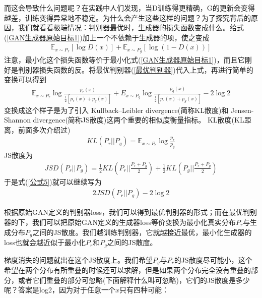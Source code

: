             而这会导致什么问题呢？在实践中人们发现，当D训练得更精确，G的更新会变得越差，训练变得异常地不稳定。为什么会产生这些这样的问题？为了探究背后的原因，我们就看看极端情况：判别器最优时，生成器的损失函数变成什么。给式(\ref{GAN生成器原始目标1})加上一个不依赖于生成器的项，使之变成
            \begin{align*}
            \mathbb{E}_{x\sim P_r}[\log D(x)] + \mathbb{E}_{x\sim P_g}[\log (1-D(x))]
            \end{align*}
            注意，最小化这个损失函数等价于最小化式(\ref{GAN生成器原始目标1})，而且它刚好是判别器损失函数的反。将最优判别器(\ref{最优判别器})代入上式，再进行简单的变换可以得到
            \begin{align}
            \label{公式5}
            \mathbb{E}_{x\sim P_r}\log \frac{p_r(x)}{\frac{1}{2}[p_r(x) + p_g(x)]} + E_{x\sim P_g}\log \frac{p_g(x)}{\frac{1}{2}[p_r(x)+p_g(x)]} - 2\log 2
            \end{align}
            变换成这个样子是为了引入 Kullback–Leibler divergence(简称KL散度)和 Jensen-Shannon divergence(简称JS散度)这两个重要的相似度衡量指标。
            KL散度(KL距离，前面多次介绍过)
            \begin{align*}
            KL(P_r||P_g) = \mathbb{E}_{x\sim P_r}\log \frac{p_r}{p_g}
            \end{align*}
            JS散度为
            \begin{align}
            \label{JS散度}
            JSD(P_r||P_g) = \frac{1}{2}KL \left( P_r \Big|\Big| \frac{P_r+P_g}{2} \right) + \frac{1}{2} KL\left( P_g \Big|\Big| \frac{P_r+P_g}{2} \right)
            \end{align}
            于是式(\ref{公式5})就可以继续写为
            \begin{align*}
            2JSD(P_r||P_g) - 2\log 2
            \end{align*}
            \par
            根据原始GAN定义的判别器loss，我们可以得到最优判别器的形式；而在最优判别器的下，我们可以把原始GAN定义的生成器loss等价变换为最小化真实分布$P_r$与生成分布$P_g$之间的JS散度。我们越训练判别器，它就越接近最优，最小化生成器的loss也就会越近似于最小化$P_r$和$P_g$之间的JS散度。
            \par
            梯度消失的问题就出在这个JS散度上。我们希望$P_g$与$P_r$的JS散度尽可能小，这个希望在两个分布有所重叠的时候还可以求解，但是如果两个分布完全没有重叠的部分，或者它们重叠的部分可忽略(下面解释什么叫可忽略)，它们的JS散度是多少呢？答案是log2，因为对于任意一个$x$只有四种可能：
